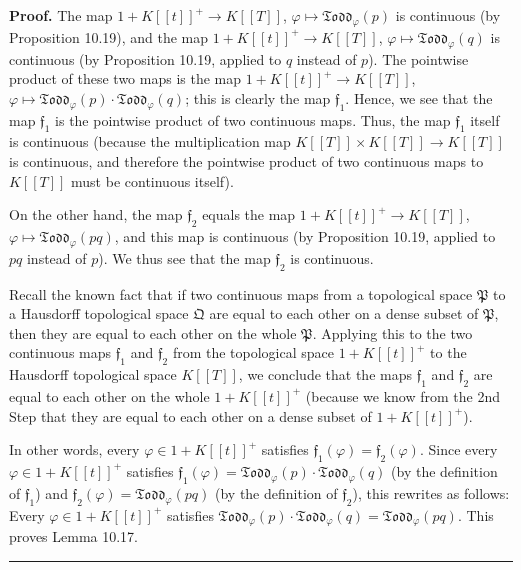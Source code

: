 \documentclass[numbers=enddot,12pt,final,onecolumn,notitlepage]{scrartcl}%
\newenvironment{proof}[1][Proof]{\noindent\textbf{#1.} }{\ \rule{0.5em}{0.5em}}
\begin{document}
\begin{proof}
The map $1+K\left[  \left[  t\right]  \right]  ^{+}\rightarrow K\left[
\left[  T\right]  \right]  $, $\varphi\mapsto\mathfrak{Todd}_{\varphi}\left(
p\right)  $ is continuous (by Proposition 10.19), and the map $1+K\left[
\left[  t\right]  \right]  ^{+}\rightarrow K\left[  \left[  T\right]  \right]
$, $\varphi\mapsto\mathfrak{Todd}_{\varphi}\left(  q\right)  $ is continuous
(by Proposition 10.19, applied to $q$ instead of $p$). The pointwise product
of these two maps is the map $1+K\left[  \left[  t\right]  \right]
^{+}\rightarrow K\left[  \left[  T\right]  \right]  $, $\varphi\mapsto
\mathfrak{Todd}_{\varphi}\left(  p\right)  \cdot\mathfrak{Todd}_{\varphi
}\left(  q\right)  $; this is clearly the map $\mathfrak{f}_{1}$. Hence, we
see that the map $\mathfrak{f}_{1}$ is the pointwise product of two continuous
maps. Thus, the map $\mathfrak{f}_{1}$ itself is continuous (because the
multiplication map $K\left[  \left[  T\right]  \right]  \times K\left[
\left[  T\right]  \right]  \rightarrow K\left[  \left[  T\right]  \right]  $
is continuous, and therefore the pointwise product of two continuous maps to
$K\left[  \left[  T\right]  \right]  $ must be continuous itself).

On the other hand, the map $\mathfrak{f}_{2}$ equals the map $1+K\left[
\left[  t\right]  \right]  ^{+}\rightarrow K\left[  \left[  T\right]  \right]
$, $\varphi\mapsto\mathfrak{Todd}_{\varphi}\left(  pq\right)  $, and this map
is continuous (by Proposition 10.19, applied to $pq$ instead of $p$). We thus
see that the map $\mathfrak{f}_{2}$ is continuous.

Recall the known fact that if two continuous maps from a topological space
$\mathfrak{P}$ to a Hausdorff topological space $\mathfrak{Q}$ are equal to
each other on a dense subset of $\mathfrak{P}$, then they are equal to each
other on the whole $\mathfrak{P}$. Applying this to the two continuous maps
$\mathfrak{f}_{1}$ and $\mathfrak{f}_{2}$ from the topological space
$1+K\left[  \left[  t\right]  \right]  ^{+}$ to the Hausdorff topological
space $K\left[  \left[  T\right]  \right]  $, we conclude that the maps
$\mathfrak{f}_{1}$ and $\mathfrak{f}_{2}$ are equal to each other on the whole
$1+K\left[  \left[  t\right]  \right]  ^{+}$ (because we know from the 2nd
Step that they are equal to each other on a dense subset of $1+K\left[
\left[  t\right]  \right]  ^{+}$).

In other words, every $\varphi\in1+K\left[  \left[  t\right]  \right]  ^{+}$
satisfies $\mathfrak{f}_{1}\left(  \varphi\right)  =\mathfrak{f}_{2}\left(
\varphi\right)  $. Since every $\varphi\in1+K\left[  \left[  t\right]
\right]  ^{+}$ satisfies $\mathfrak{f}_{1}\left(  \varphi\right)
=\mathfrak{Todd}_{\varphi}\left(  p\right)  \cdot\mathfrak{Todd}_{\varphi
}\left(  q\right)  $ (by the definition of $\mathfrak{f}_{1}$) and
$\mathfrak{f}_{2}\left(  \varphi\right)  =\mathfrak{Todd}_{\varphi}\left(
pq\right)  $ (by the definition of $\mathfrak{f}_{2}$), this rewrites as
follows: Every $\varphi\in1+K\left[  \left[  t\right]  \right]  ^{+}$
satisfies $\mathfrak{Todd}_{\varphi}\left(  p\right)  \cdot\mathfrak{Todd}%
_{\varphi}\left(  q\right)  =\mathfrak{Todd}_{\varphi}\left(  pq\right)  $.
This proves Lemma 10.17.
\end{proof}
\end{document}
